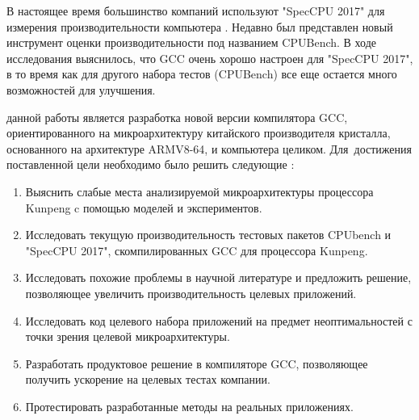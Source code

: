 В настоящее время большинство компаний используют "SpecCPU 2017"\phantom{} для измерения производительности компьютера \ifsynopsis\else \cite{panda2018wait,bucek2018spec}\fi. Недавно был представлен новый инструмент оценки производительности под названием CPUBench\ifsynopsis\else\phantom{ }\cite {lu2023cpubench}\fi. В ходе исследования выяснилось, что GCC очень хорошо настроен для "SpecCPU 2017"\phantom{}, в то время как для другого набора тестов (CPUBench) все еще остается много возможностей для улучшения.



{\aim} данной работы является 
разработка новой версии компилятора GCC, ориентированного на микроархитектуру китайского производителя кристалла, основанного на архитектуре ARMV8-64, 
и компьютера целиком.
Для~достижения поставленной цели необходимо было решить следующие {\tasks}:
\begin{enumerate}[beginpenalty=10000] %
  \item Выяснить слабые места анализируемой микроархитектуры процессора Kunpeng c помощью моделей и экспериментов.
  \item Исследовать текущую производительность тестовых пакетов CPUbench и "SpecCPU 2017"\phantom{}, скомпилированных GCC для процессора Kunpeng.
  \item Исследовать похожие проблемы в научной литературе и предложить решение, позволяющее увеличить производительность целевых приложений.
  \item Исследовать код целевого набора приложений на предмет неоптимальностей с точки зрения целевой микроархитектуры.
  \item Разработать продуктовое решение в компиляторе GCC, позволяющее получить ускорение на целевых тестах компании.
  \item Протестировать разработанные методы на реальных приложениях. 
\end{enumerate}

